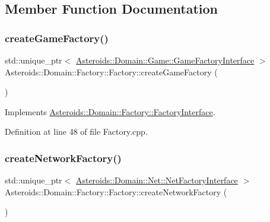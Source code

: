 \subsection{Member Function Documentation}
\mbox{\label{classAsteroids_1_1Domain_1_1Factory_1_1Factory_a8029c274a6886b2aef3b31d1bd15da77}} 
\subsubsection{\texorpdfstring{create\+Game\+Factory()}{createGameFactory()}}
{\footnotesize\ttfamily std\+::unique\+\_\+ptr$<$ \hyperlink{classAsteroids_1_1Domain_1_1Game_1_1GameFactoryInterface}{Asteroids\+::\+Domain\+::\+Game\+::\+Game\+Factory\+Interface} $>$ Asteroids\+::\+Domain\+::\+Factory\+::\+Factory\+::create\+Game\+Factory (\begin{DoxyParamCaption}{ }\end{DoxyParamCaption})\hspace{0.3cm}{\ttfamily [virtual]}}



Implements \hyperlink{classAsteroids_1_1Domain_1_1Factory_1_1FactoryInterface_a1589f6b3a9c7d1ee34e9e312b6adb2c8}{Asteroids\+::\+Domain\+::\+Factory\+::\+Factory\+Interface}.



Definition at line 48 of file Factory.\+cpp.

\mbox{\label{classAsteroids_1_1Domain_1_1Factory_1_1Factory_abde97e85ba71b218eed2e3ff534a7d56}} 
\subsubsection{\texorpdfstring{create\+Network\+Factory()}{createNetworkFactory()}}
{\footnotesize\ttfamily std\+::unique\+\_\+ptr$<$ \hyperlink{classAsteroids_1_1Domain_1_1Net_1_1NetFactoryInterface}{Asteroids\+::\+Domain\+::\+Net\+::\+Net\+Factory\+Interface} $>$ Asteroids\+::\+Domain\+::\+Factory\+::\+Factory\+::create\+Network\+Factory (\begin{DoxyParamCaption}{ }\end{DoxyParamCaption})\hspace{0.3cm}{\ttfamily [virtual]}}



